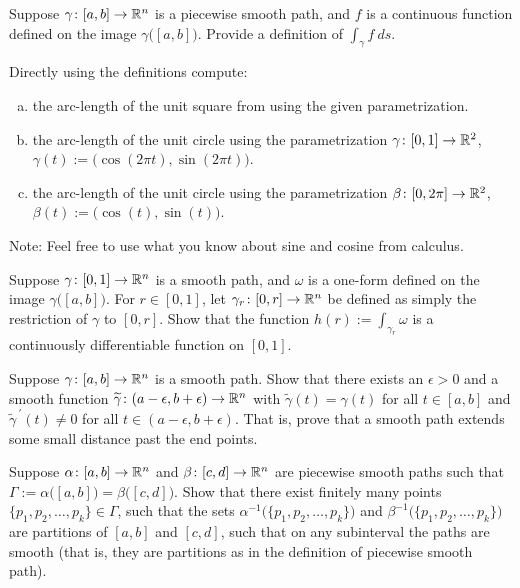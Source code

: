 \begin{exercise}
Suppose $\gamma \colon [a,b] \to {\mathbb{R}}^n$ is a piecewise smooth path, and $f$ is a
continuous function defined on the image $\gamma\bigl([a,b]\bigr)$.
Provide a definition of $\int_{\gamma} f ~ds$.
\end{exercise}

\begin{exercise}
Directly using the definitions compute:
\begin{enumerate}[a)]
\item
the arc-length of the unit square from
 using the given parametrization.
\item
the arc-length of the unit circle using the parametrization
$\gamma \colon [0,1] \to {\mathbb{R}}^2$, $\gamma(t) := \bigl(\cos(2\pi t),\sin(2\pi t)\bigr)$.
\item
the arc-length of the unit circle using the parametrization
$\beta \colon [0,2\pi] \to {\mathbb{R}}^2$, $\beta(t) := \bigl(\cos(t),\sin(t)\bigr)$.
\end{enumerate}
Note: Feel free to use what you know about sine and cosine from calculus.
\end{exercise}

\begin{exercise}
Suppose $\gamma \colon [0,1] \to {\mathbb{R}}^n$ is a smooth path, and
$\omega$ is a one-form defined on the image $\gamma\bigl([a,b]\bigr)$.
For $r \in [0,1]$, let $\gamma_r \colon [0,r] \to {\mathbb{R}}^n$ be defined
as simply the restriction of $\gamma$ to $[0,r]$.  Show that the
function $h(r) := \int_{\gamma_r} \omega$ is a continuously
differentiable function on $[0,1]$.
\end{exercise}

\begin{exercise}
Suppose $\gamma \colon [a,b] \to {\mathbb{R}}^n$ is a smooth path.
Show that there exists an $\epsilon > 0$ and a smooth function
$\widetilde{\gamma} \colon (a-\epsilon,b+\epsilon) \to {\mathbb{R}}^n$
with $\widetilde{\gamma}(t) = \gamma(t)$ for all $t \in [a,b]$
and $\widetilde{\gamma}^{\:\prime}(t) \not= 0$ for all $t \in 
(a-\epsilon,b+\epsilon)$.  That is, prove that a smooth path extends
some small distance past the end points.
\end{exercise}

\begin{exercise} 
Suppose $\alpha \colon [a,b] \to {\mathbb{R}}^n$ and
$\beta \colon [c,d] \to {\mathbb{R}}^n$ are piecewise smooth paths such that
$\Gamma := \alpha\bigl([a,b]\bigr) = \beta\bigl([c,d]\bigr)$.
Show that there exist finitely many points
$\{ p_1,p_2,\ldots,p_k\} \in \Gamma$, such that
the sets
$\alpha^{-1}\bigl( \{ p_1,p_2,\ldots,p_k\} \bigr)$
and
$\beta^{-1}\bigl( \{ p_1,p_2,\ldots,p_k\} \bigr)$
are partitions of $[a,b]$ and $[c,d]$, such that on any subinterval
the paths are smooth (that is, they are partitions as in the definition
of piecewise smooth path).
\end{exercise}

